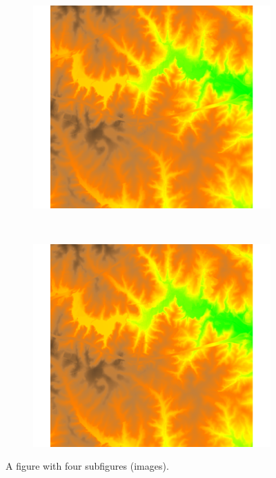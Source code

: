 \documentclass[10pt]{article}
\newcommand{\twobytwoimgwidth}{0.4\textwidth}
\begin{document}
\begin{figure}[htbp]
\begin{subfigure}[b]{\twobytwoimgwidth}
    \caption{}
  \end{subfigure}
  \\[0.01\textheight]
    \begin{subfigure}[b]{\twobytwoimgwidth}
    \includegraphics[width=\textwidth]{report_template_image}
    \caption{}
  \end{subfigure}
  ~
  \begin{subfigure}[b]{\twobytwoimgwidth}
    \includegraphics[width=\textwidth]{report_template_image}
    \caption{}
  \end{subfigure}%
  \caption{A figure with four subfigures (images).}
  \label{fig:afigure}
\end{figure}
\end{document}
